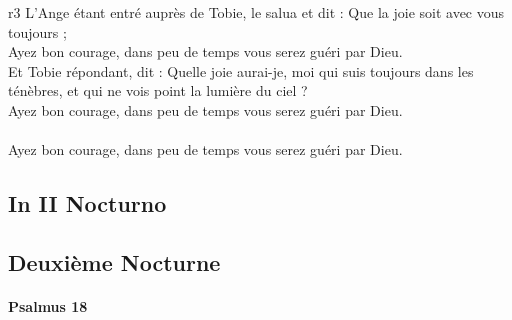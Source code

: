 \documentclass[twoside]{article}
\begin{document}
\begin{paracol}[1]{2}
{	}
	{r3}
	{\vfill
	\rr L’Ange étant entré auprès de Tobie, le salua et dit : Que la joie soit avec vous toujours ;\\
	\GreSpecial{*} Ayez bon courage, dans peu de temps vous serez guéri par Dieu.\\
	\vv Et Tobie répondant, dit : Quelle joie aurai-je, moi qui suis toujours dans les ténèbres, et qui ne vois point la lumière du ciel ?\\
	\GreSpecial{*} Ayez bon courage, dans peu de temps vous serez guéri par Dieu.\\
	\versetGloireAuPere{}\\
	\GreSpecial{*} Ayez bon courage, dans peu de temps vous serez guéri par Dieu.\vfill\newpage}

\subsection{In II Nocturno}

\switchcolumn

\subsection{Deuxième Nocturne}

\switchcolumn*

\paragraph{Psalmus 18}



\end{paracol}
\end{document}
